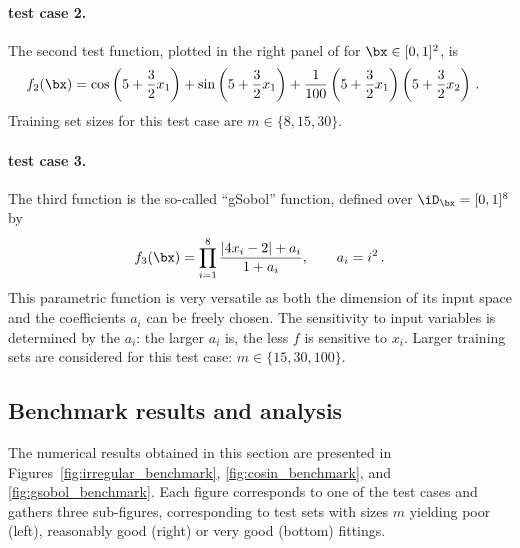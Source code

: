 \paragraph{test case 2.}

The second test function, plotted in the right panel of  for $\bx\in[0,1]^2$, is 
\begin{align*}
   f_2(\bx) 
   &= \cos \left(5 + \frac{3}{2}x_1 \right) + \sin \left(5 + \frac{3}{2}x_1 \right) 
   + \frac{1}{100} \left(5 + \frac{3}{2}x_1 \right) \left(5 + \frac{3}{2}x_2 \right)\,.
\end{align*}
Training set sizes for this test case are $m\in\{8, 15, 30\}$.

\paragraph{test case 3.}

The third function is the so-called ``gSobol'' function, defined over $\iD_\bx=[0,1]^8$ by
\begin{equation*}
  f_3(\bx) = \prod_{i=1}^{8} \frac{|4x_i - 2| + a_i}{1 + a_i}, \qquad a_i = i^2 \,.
\end{equation*}
This parametric function is very versatile as both the dimension of its input space and the coefficients $a_i$ can be freely chosen. 
The sensitivity to input variables is determined by the $a_i$: the larger $a_i$ is, the less $f$ is sensitive to $x_i$. 
Larger training sets are considered for this test case: $m\in\{15, 30, 100\}$.

\subsection{Benchmark results and analysis}

The numerical results obtained in this section are presented in Figures~\ref{fig:irregular_benchmark}, \ref{fig:cosin_benchmark}, and \ref{fig:gsobol_benchmark}. 
Each figure corresponds to one of the test cases and gathers three sub-figures, corresponding to test sets with sizes $m$ yielding poor (left), reasonably good (right) or very good (bottom) fittings. 
 
